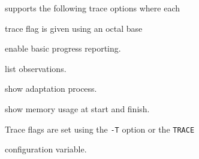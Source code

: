 









 supports the following trace options where each


trace flag is given using an octal base


\begin{optlist}


    enable basic progress reporting.  


    list observations.


    show adaptation process.


    show memory usage at start and finish.


\end{optlist}


Trace flags are set using the \texttt{-T} option or the \texttt{TRACE} 


configuration variable.










